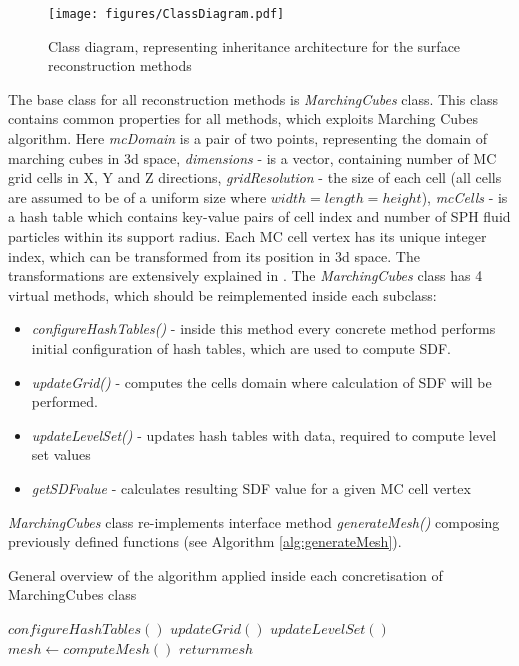 \begin{figure}[H]

	\begin{center}
		\texttt{[image: figures/ClassDiagram.pdf]}
	\end{center}
	\caption{Class diagram, representing inheritance architecture for the surface reconstruction methods}
    \label{fig:class-diagam}
\end{figure}
The base class for all reconstruction methods is \emph{MarchingCubes} class. This class contains common properties for all methods, which exploits Marching Cubes algorithm. Here \emph{mcDomain} is a pair of two points, representing the domain of marching cubes in 3d space, \emph{dimensions} - is a vector, containing number of MC grid cells in X, Y and Z directions, \emph{gridResolution} - the size of each cell (all cells are assumed to be of a uniform size where $width=length=height$), \emph{mcCells} - is a hash table which contains key-value pairs of cell index and number of SPH fluid particles within its support radius. Each MC cell vertex has its unique integer index, which can be transformed from its position in 3d space. The transformations are extensively explained in \cite{Akinchi}. 
The \emph{MarchingCubes} class has 4 virtual methods, which should be reimplemented inside each subclass:
\begin{itemize}
	\item \emph{configureHashTables()} - inside this method every concrete method performs initial configuration of hash tables, which are used to compute SDF.
	\item \emph{updateGrid()} - computes the cells domain where calculation of SDF will be performed.
	\item \emph{updateLevelSet()} - updates hash tables with data, required to compute level set values
	\item \emph{getSDFvalue} - calculates resulting SDF value for a given MC cell vertex
\end{itemize}

\emph{MarchingCubes} class re-implements interface method \emph{generateMesh()} composing previously defined functions (see Algorithm \ref{alg:generateMesh}).

\begin{algorithm}
	\caption{General overview of the algorithm applied inside each concretisation of MarchingCubes class}
	\label{alg:generateMesh}
	\begin{algorithmic}
		\State $configureHashTables()$
		\State $updateGrid()$
		\State $updateLevelSet()$
		\State $mesh \gets computeMesh()$ 
		\State $return mesh$
	\end{algorithmic}
\end{algorithm}

